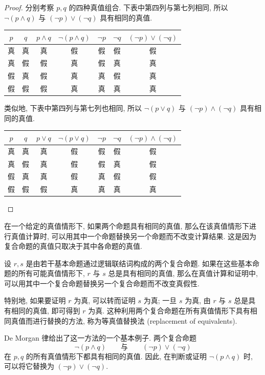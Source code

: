 \documentclass[usesamecnt, thmcnt=section, lang=cn, newtx, 10pt, scheme=chinese]{elegantbook}
\begin{document}
\begin{proof}
分别考察 $p,q$ 的四种真值组合. 下表中第四列与第七列相同, 所以 $\neg(p\wedge q)$ 与 $(\neg p)\vee(\neg q)$ 具有相同的真值.

\begin{table}[H]
\centering
\begin{tabular}{|c|c|c|c|c|c|c|}
\hline
$p$ & $q$ & $p\wedge q$ & $\neg(p\wedge q)$ & $\neg p$& $\neg q$ & $(\neg p)\vee(\neg q)$\\
\hline
真 & 真 & 真 & 假 & 假 & 假 & 假\\
真 & 假 & 假 & 真 & 假 & 真 & 真\\
假 & 真 & 假 & 真 & 真 & 假 & 真\\
假 & 假 & 假 & 真 & 真 & 真 & 真\\
\hline
\end{tabular}
\end{table}

类似地, 下表中第四列与第七列也相同, 所以 $\neg(p\vee q)$ 与 $(\neg p)\wedge(\neg q)$ 具有相同的真值.
\begin{table}[H]
\centering
\begin{tabular}{|c|c|c|c|c|c|c|}
\hline
$p$ & $q$ & $p\vee q$ & $\neg(p\vee q)$ & $\neg p$ & $\neg q$ & $(\neg p)\wedge(\neg q)$\\
\hline
真 & 真 & 真 & 假 & 假 & 假 & 假\\
真 & 假 & 真 & 假 & 假 & 真 & 假\\
假 & 真 & 真 & 假 & 真 & 假 & 假\\
假 & 假 & 假 & 真 & 真 & 真 & 真\\
\hline
\end{tabular}
\end{table}
\end{proof}

在一个给定的真值情形下, 如果两个命题具有相同的真值, 那么在该真值情形下进行真值计算时, 可以用其中一个命题替换另一个命题而不改变计算结果. 这是因为复合命题的真值只取决于其中各命题的真值.

\begin{definition}[等真值替换法]\label{def:truth-value-substitution}
设 $r,s$ 是由若干基本命题通过逻辑联结词构成的两个复合命题. 如果在这些基本命题的所有可能真值情形下, $r$ 与 $s$ 总是具有相同的真值, 那么在真值计算和证明中, 可以用其中一个复合命题替换另一个复合命题而不改变真假性.

特别地, 如果要证明 $r$ 为真, 可以转而证明 $s$ 为真; 一旦 $s$ 为真, 由 $r$ 与 $s$ 总是具有相同的真值, 即可得到 $r$ 为真. 这种利用两个复合命题在所有真值情形下具有相同真值而进行替换的方法, 称为{\color{blue}等真值替换法 (replacement of equivalents)}.

De Morgan 律给出了这一方法的一个基本例子. 两个复合命题
\[
\neg(p\wedge q)
\qquad\text{与}\qquad
(\neg p)\vee(\neg q)
\]
在 $p,q$ 的所有真值情形下都具有相同的真值. 因此, 在判断或证明
$\neg(p\wedge q)$ 时, 可以将它替换为
$(\neg p)\vee(\neg q)$.
\end{definition}
\end{document}
